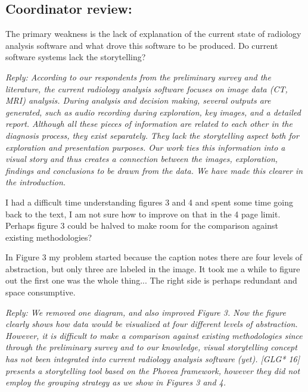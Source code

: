 \documentclass{article}
\newcommand{\cre}[1]{{\color{red}#1}}
\begin{document}
	
	\subsection*{Coordinator review:}
	
	The primary weakness is the lack of explanation of the current state of radiology analysis software and what drove this software to be produced. Do current software systems lack the storytelling?
	
	{\em Reply: According to our respondents from the preliminary survey and the literature, the current radiology analysis software focuses on image data (CT, MRI) analysis. During analysis and decision making, several outputs are generated, such as audio recording during exploration, key images, and a detailed report. Although all these pieces of information are related to each other in the diagnosis process, they exist separately. They lack the storytelling aspect both for exploration and presentation purposes. Our work ties this information into a visual story and thus creates a connection between the images, exploration, findings and conclusions to be drawn from the data. We have made this clearer in the introduction.
	}
	
	\vspace{.5 cm}
	
	I had a difficult time understanding figures 3 and 4 and spent some time going back to the text, I am not sure how to improve on that in the 4 page limit.
	Perhaps figure 3 could be halved to make room for the comparison against existing
	methodologies?
	
	In Figure 3 my problem started because the caption notes there are four levels of
	abstraction, but only three are labeled in the image. It took me a while to figure
	out the first one was the whole thing... The right side is perhaps redundant and
	space consumptive.
	
	{\em Reply: We removed one diagram, and also improved Figure 3. Now the figure clearly shows how data would be visualized at four different levels of abstraction.
		However, it is difficult to make a comparison against existing methodologies since through the preliminary survey and to our knowledge, visual storytelling concept has not been integrated into current radiology analysis software (yet). [GLG* 16] presents a storytelling tool based on the Phovea framework, however they did not employ the grouping strategy as we show in Figures 3 and 4.}
	
\end{document}
